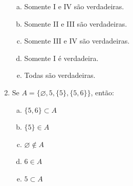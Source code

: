\documentclass[a4paper,14pt]{article}
\begin{document}
\begin{multicols}{2}
\begin{enumerate}
			\begin{enumerate}[a)]
				\item Somente I e IV são verdadeiras.
				\item Somente II e III são verdadeiras.
				\item Somente III e IV são verdadeiras.
				\item Somente I é verdadeira.
				\item Todas são verdadeiras. 
			\end{enumerate}
			\item Se $A = \{\varnothing, 5, \{5\}, \{5, 6\}\}$, então:
			\begin{enumerate}[a)]
				\item $\{5, 6\} \subset A$
				\item $\{5\} \in A$
				\item $\varnothing \not\in A$
				\item $6 \in A$
				\item $5 \subset A$
			\end{enumerate}
		\end{enumerate}

\end{multicols}
\end{document}
